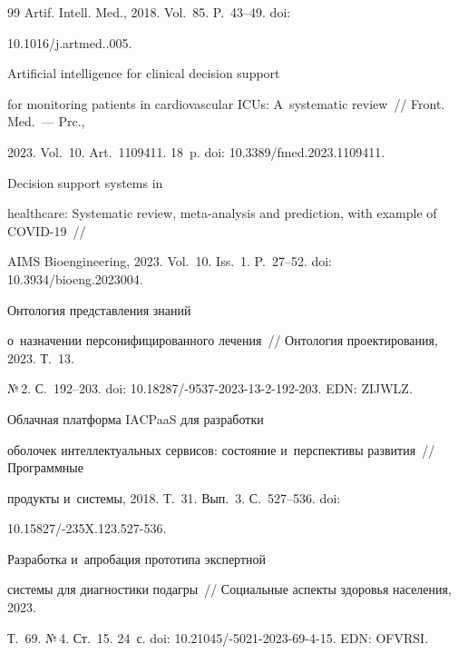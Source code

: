 {{\begin{thebibliography}{99}
Artif. Intell. Med., 2018. Vol.~85. P.~43--49. doi: 

10.1016\!/\!j.artmed..005.


 Artificial intelligence for clinical decision support 

for monitoring patients in cardiovascular ICUs: A~systematic review~/\!\!/ Front. Med.~--- Prc., 

2023. Vol.~10. Art.~1109411. 18~p. doi: 10.3389\!/\!fmed.2023.1109411.


 Decision support systems in 

healthcare: Systematic review, meta-analysis and prediction, with example of COVID-19~/\!\!/ 

AIMS Bioengineering, 2023. Vol.~10. Iss.~1. P.~27--52. doi: 10.3934\!/\linebreak bioeng.2023004.


 Онтология представления знаний 

о~назначении персонифицированного лечения~/\!\!/ Онтология проектирования, 2023. Т.~13. 

№\,2. С.~192--203. doi: 10.18287\!/-9537-2023-13-2-192-203. EDN: ZIJWLZ.


 Облачная платформа \mbox{IACPaaS} для разработки 

оболочек интеллектуальных сервисов: состояние и~перспективы развития~/\!\!/ Программные 

продукты и~системы, 2018. Т.~31. Вып.~3. С.~527--536. doi:  

10.15827\!/-235X.123.527-536.


 Разработка и~апробация прототипа экспертной 

системы для диагностики подагры~/\!\!/ Социальные аспекты здоровья населения, 2023. 

Т.~69. №\,4. Ст.~15. 24~с. doi: 10.21045\!/-5021-2023-69-4-15.  EDN: OFVRSI.



\end{thebibliography}}}
